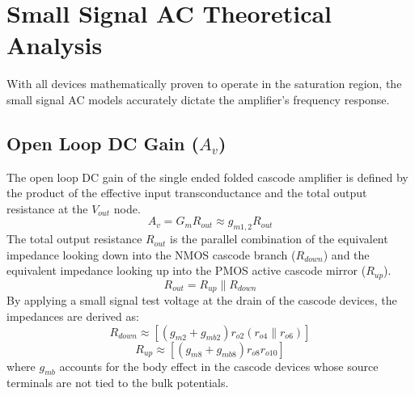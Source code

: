 \documentclass[conference]{IEEEtran}
\begin{document}
\section{Small Signal AC Theoretical Analysis}
With all devices mathematically proven to operate in the saturation region, the small signal AC models accurately dictate the amplifier's frequency response.

\subsection{Open Loop DC Gain ($A_{v}$)}
The open loop DC gain of the single ended folded cascode amplifier is defined by the product of the effective input transconductance and the total output resistance at the $V_{out}$ node.
\begin{equation}
    A_{v} = G_m R_{out} \approx g_{m1,2} R_{out}
\end{equation}
The total output resistance $R_{out}$ is the parallel combination of the equivalent impedance looking down into the NMOS cascode branch ($R_{down}$) and the equivalent impedance looking up into the PMOS active cascode mirror ($R_{up}$).
\begin{equation}
    R_{out} = R_{up} \parallel R_{down}
\end{equation}
By applying a small signal test voltage at the drain of the cascode devices, the impedances are derived as:
\begin{equation}
    R_{down} \approx \left[ (g_{m2} + g_{mb2}) r_{o2} (r_{o4} \parallel r_{o6}) \right]
\end{equation}
\begin{equation}
    R_{up} \approx \left[ (g_{m8} + g_{mb8}) r_{o8} r_{o10} \right]
\end{equation}
where $g_{mb}$ accounts for the body effect in the cascode devices whose source terminals are not tied to the bulk potentials.
\end{document}
